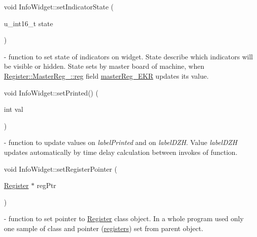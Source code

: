 \mbox{\label{classInfoWidget_a78af7f055dbb07026ecf1c820b0381bb}} 
{\footnotesize\ttfamily void Info\+Widget\+::\texorpdfstring{set\+Indicator\+State}{setIndicatorState} (\begin{DoxyParamCaption}\item[{u\+\_\+int16\+\_\+t}]{state }\end{DoxyParamCaption})} - function to set state of indicators on widget. State describe which indicators will be visible or hidden. State sets by master board of machine, when \hyperlink{structRegister_1_1MasterReg___1_1reg}{Register\+::\+Master\+Reg\+\_\+\+::reg} field \hyperlink{structRegister_1_1MasterReg___1_1reg_aa5111a7f8eddbd8f8d6c92e23f326946}{master\+Reg\+\_\+\+E\+KR} updates its value.

\mbox{\label{classInfoWidget_a8a4f1e9fea6f1a9794dffbb264fa7455}} 
{\footnotesize\ttfamily void Info\+Widget\+::\texorpdfstring{set\+Printed()}{setPrinted()} (\begin{DoxyParamCaption}\item[{int}]{val }\end{DoxyParamCaption})} - function to update values on \textit{label\+Printed} and on \textit{label\+DZH}. Value \textit{label\+DZH} updates automatically by time delay calculation between invokes of function.

\mbox{\label{classInfoWidget_a36d29faf6a45282ca2b46ca53de0be19}} 
{\footnotesize\ttfamily void Info\+Widget\+::\texorpdfstring{set\+Register\+Pointer}{setRegisterPointer} (\begin{DoxyParamCaption}\item[{\mbox{\hyperlink{classRegister}{Register}} $\ast$}]{reg\+Ptr }\end{DoxyParamCaption})}  - function to set pointer to \hyperlink{classRegister}{Register} class object. In a whole program used only one sample of class and pointer (\hyperlink{classMainWindow_aead190b1b4ca3ce95076274ab2ae6f84}{registers}) set from parent object. 

